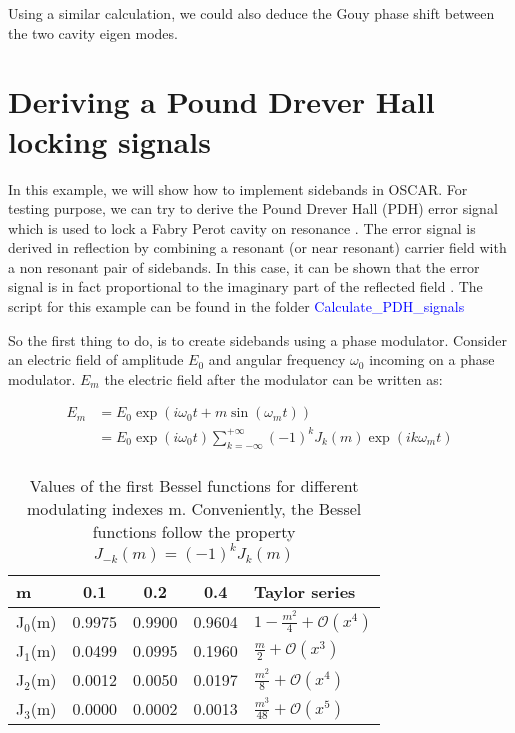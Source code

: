 Using a similar calculation, we could also deduce the Gouy phase shift between the two cavity eigen modes.

\section{Deriving a Pound Drever Hall locking signals}
\label{cha3.4}

In this example, we will show how to implement sidebands in OSCAR. For testing purpose, we can try to derive the Pound Drever Hall (PDH) error signal which is used to lock a Fabry Perot cavity on resonance \cite{PDH}. The error signal is derived in reflection by combining a resonant (or near resonant) carrier field with a non resonant pair of sidebands. In this case, it can be shown that the error signal is in fact proportional to the imaginary part of the reflected field \cite{black:79}. The script for this example can be found in the folder \textcolor{blue}{Calculate\_PDH\_signals}

So the first thing to do, is to create sidebands using a phase modulator. Consider an electric field of amplitude $E_0$ and angular frequency $\omega_0$ incoming on a phase modulator. $E_m$ the electric field after the modulator can be written as:

\begin{equation}
\begin{split}
E_m & = E_0 \exp(i \omega_0 t + m \sin(\omega_m t))\\
    & = E_0 \exp(i \omega_0 t) \sum_{k = -\infty}^{+\infty} (-1)^k J_k(m) \exp(i k \omega_m t) \\
\end{split}
\label{eq3:bessel}
\end{equation}

\begin{table}[tbp]
  \centering
  \caption{\label{tab3:bessel} Values of the first Bessel functions for different modulating indexes m. Conveniently, the Bessel functions follow the property $J_{-k}(m) = (-1)^k J_{k}(m)$ }
\begin{tabular}{|l c c c|l|}
\hline
{\Large\strut} m & 0.1 & 0.2 & 0.4 & Taylor series\\
\hline
{\Large\strut} J$_0$(m) & 0.9975 & 0.9900 & 0.9604 & $1 - \frac{m^2}{4} + \mathcal{O}(x^4)$\\
{\Large\strut} J$_1$(m) & 0.0499 & 0.0995 & 0.1960 & $\frac{m}{2} + \mathcal{O}(x^3)$\\
{\Large\strut} J$_2$(m) & 0.0012 & 0.0050 & 0.0197 & $\frac{m^2}{8} + \mathcal{O}(x^4)$\\
{\Large\strut} J$_3$(m) & 0.0000 & 0.0002 & 0.0013 & $\frac{m^3}{48} + \mathcal{O}(x^5)$\\
\hline
\end{tabular}
\end{table}

